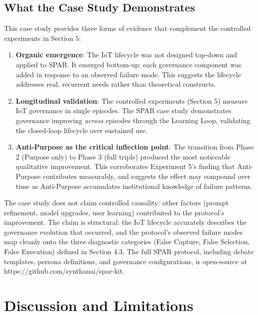 \documentclass[11pt,a4paper]{article}
\begin{document}
\subsection{What the Case Study
Demonstrates}\label{what-the-case-study-demonstrates}

This case study provides three forms of evidence that complement the
controlled experiments in Section 5:

\begin{enumerate}
\def\labelenumi{\arabic{enumi}.}
\item
  \textbf{Organic emergence}: The IoT lifecycle was not designed
  top-down and applied to SPAR. It emerged bottom-up: each governance
  component was added in response to an observed failure mode. This
  suggests the lifecycle addresses real, recurrent needs rather than
  theoretical constructs.
\item
  \textbf{Longitudinal validation}: The controlled experiments (Section
  5) measure IoT governance in single episodes. The SPAR case study
  demonstrates governance improving \emph{across} episodes through the
  Learning Loop, validating the closed-loop lifecycle over sustained
  use.
\item
  \textbf{Anti-Purpose as the critical inflection point}: The transition
  from Phase 2 (Purpose only) to Phase 3 (full triple) produced the most
  noticeable qualitative improvement. This corroborates Experiment 5's
  finding that Anti-Purpose contributes measurably, and suggests the
  effect may compound over time as Anti-Purpose accumulates
  institutional knowledge of failure patterns.
\end{enumerate}

The case study does not claim controlled causality: other factors
(prompt refinement, model upgrades, user learning) contributed to the
protocol's improvement. The claim is structural: the IoT lifecycle
accurately describes the governance evolution that occurred, and the
protocol's observed failure modes map cleanly onto the three diagnostic
categories (False Capture, False Selection, False Execution) defined in
Section 4.3. The full SPAR protocol, including debate templates, persona
definitions, and governance configurations, is open-source at
https://github.com/synthanai/spar-kit.

\section{Discussion and Limitations}\label{discussion-and-limitations}
\end{document}
